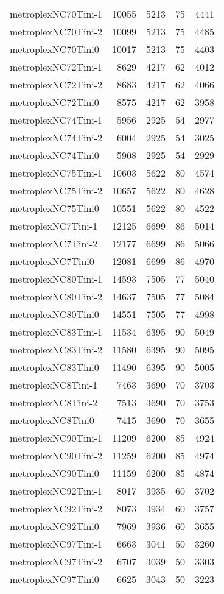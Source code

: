 \begin{longtable}{lrrrr}
metroplexNC70Tini-1 & 10055 & 5213 & 75 & 4441 \\
metroplexNC70Tini-2 & 10099 & 5213 & 75 & 4485 \\
metroplexNC70Tini0 & 10017 & 5213 & 75 & 4403 \\
metroplexNC72Tini-1 & 8629 & 4217 & 62 & 4012 \\
metroplexNC72Tini-2 & 8683 & 4217 & 62 & 4066 \\
metroplexNC72Tini0 & 8575 & 4217 & 62 & 3958 \\
metroplexNC74Tini-1 & 5956 & 2925 & 54 & 2977 \\
metroplexNC74Tini-2 & 6004 & 2925 & 54 & 3025 \\
metroplexNC74Tini0 & 5908 & 2925 & 54 & 2929 \\
metroplexNC75Tini-1 & 10603 & 5622 & 80 & 4574 \\
metroplexNC75Tini-2 & 10657 & 5622 & 80 & 4628 \\
metroplexNC75Tini0 & 10551 & 5622 & 80 & 4522 \\
metroplexNC7Tini-1 & 12125 & 6699 & 86 & 5014 \\
metroplexNC7Tini-2 & 12177 & 6699 & 86 & 5066 \\
metroplexNC7Tini0 & 12081 & 6699 & 86 & 4970 \\
metroplexNC80Tini-1 & 14593 & 7505 & 77 & 5040 \\
metroplexNC80Tini-2 & 14637 & 7505 & 77 & 5084 \\
metroplexNC80Tini0 & 14551 & 7505 & 77 & 4998 \\
metroplexNC83Tini-1 & 11534 & 6395 & 90 & 5049 \\
metroplexNC83Tini-2 & 11580 & 6395 & 90 & 5095 \\
metroplexNC83Tini0 & 11490 & 6395 & 90 & 5005 \\
metroplexNC8Tini-1 & 7463 & 3690 & 70 & 3703 \\
metroplexNC8Tini-2 & 7513 & 3690 & 70 & 3753 \\
metroplexNC8Tini0 & 7415 & 3690 & 70 & 3655 \\
metroplexNC90Tini-1 & 11209 & 6200 & 85 & 4924 \\
metroplexNC90Tini-2 & 11259 & 6200 & 85 & 4974 \\
metroplexNC90Tini0 & 11159 & 6200 & 85 & 4874 \\
metroplexNC92Tini-1 & 8017 & 3935 & 60 & 3702 \\
metroplexNC92Tini-2 & 8073 & 3934 & 60 & 3757 \\
metroplexNC92Tini0 & 7969 & 3936 & 60 & 3655 \\
metroplexNC97Tini-1 & 6663 & 3041 & 50 & 3260 \\
metroplexNC97Tini-2 & 6707 & 3039 & 50 & 3303 \\
metroplexNC97Tini0 & 6625 & 3043 & 50 & 3223 \\
\end{longtable}
